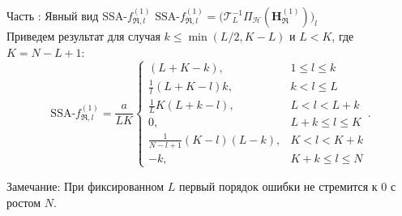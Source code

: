 \documentclass[10pt, ucs, notheorems, handout]{beamer}
\newcommand{\tX}[1]{\mathsf{#1}}
\newcommand{\iu}{\mathrm{i}\mkern1mu}
\newcommand{\RomanNumeralCaps}[1]
{\MakeUppercase{\romannumeral #1}}
\begin{document}
\begin{frame}{Часть \RomanNumeralCaps{2}: Явный вид SSA-$f^{(1)}_{\Re,l}$}
$\text{SSA-}f^{(1)}_{\Re, l} = \big( \mathcal{T}_L^{-1} \Pi_{\mathcal{H}}(\mathbf{H}^{(1)}_{\Re})\big)_{l}$\\
\vspace{1em}
    Приведем результат для случая $k \leq \min(L/2, K - L)$ и $L < K$, где $K=N-L+1$:
$$\text{SSA-}f^{(1)}_{\Re, l} = \frac{a}{{LK}}
\begin{cases}
	(L + K - k), & \text{$1 \leq l \leq k$}\\
	\frac{1}{l}(L + K - l)k, & \text{$k < l \leq L$}\\
	\frac{1}{L}K(L + k - l), &\text{$L < l < L + k$}\\
	0, &\text{$L + k \leq l \leq K$}\\
	\frac{1}{N - l + 1}(K - l)(L - k), &\text{$K < l < K + k$}\\
	-k, &\text{$K + k \leq l \leq N $}
\end{cases}.$$

\alert{Замечание:} При фиксированном $L$ первый порядок ошибки не стремится к $0$ с ростом $N$.
\end{frame}

%

%
\end{document}
